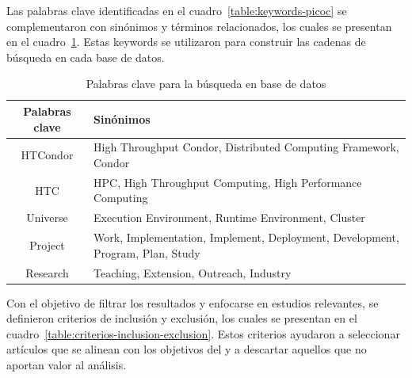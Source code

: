 Las palabras clave identificadas en el cuadro~\ref{table:keywords-picoc} se complementaron con sinónimos y términos relacionados, los cuales se presentan en el cuadro~\ref{tab:keywords}. Estas keywords se utilizaron para construir las cadenas de búsqueda en cada base de datos.


\begin{table}[H]
	\centering
	\scriptsize
	\setlength{\tabcolsep}{4pt}
	\fontsize{9pt}{10pt}\selectfont %
	\begin{tabular}{|c|p{12.5cm}|} %
		\hline
		\textbf{Palabras clave} & \textbf{Sinónimos}                                                             \\
		\hline
		HTCondor                & High Throughput Condor, Distributed Computing Framework, Condor                \\
		\hline
		HTC                     & HPC, High Throughput Computing, High Performance Computing                     \\
		\hline
		Universe                & Execution Environment, Runtime Environment, Cluster                            \\
		\hline
		Project                 & Work, Implementation, Implement, Deployment, Development, Program, Plan, Study \\
		\hline
		Research                & Teaching, Extension, Outreach, Industry                                        \\
		\hline
	\end{tabular}
	\caption{Palabras clave para la búsqueda en base de datos}
	\label{tab:keywords}
\end{table}



\noindent
Con el objetivo de filtrar los resultados y enfocarse en estudios relevantes, se definieron criterios de inclusión y exclusión, los cuales se presentan en el cuadro~\ref{table:criterios-inclusion-exclusion}. Estos criterios ayudaron a seleccionar artículos que se alinean con los objetivos del \SMS y a descartar aquellos que no aportan valor al análisis.

